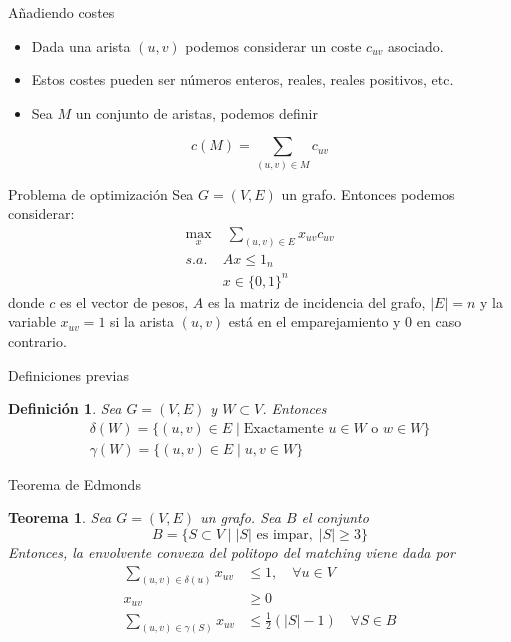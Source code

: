 \documentclass{beamer}
\newtheorem{defi}{Definici\'on}[section]
\newtheorem{thm}{Teorema}[section]
\begin{document}
\begin{frame}{Añadiendo costes}
\begin{itemize}
\item Dada una arista $(u,v)$ podemos considerar un coste $c_{uv}$ asociado. 
\item Estos costes pueden ser números enteros, reales, reales positivos, etc.
\item Sea $M$ un conjunto de aristas, podemos definir
\end{itemize}
$$
c(M) = \sum_{(u,v)\in M} c_{uv}
$$

\end{frame}
\begin{frame}{Problema de optimización}
Sea $G=(V,E)$ un grafo. Entonces podemos considerar:
\begin{align*}
\max_{x} &\; \sum_{(u,v)\in E} x_{uv}c_{uv}  \nonumber\\ 
s.a.\;  &  Ax\leq 1_n \\
& x\in\{0,1\}^n\nonumber
\end{align*}
donde $c$ es el vector de pesos, $A$ es la matriz de incidencia del grafo, $|E|=n$ y la variable $x_{uv}=1$ si la arista $(u,v)$ está en el emparejamiento y $0$ en caso contrario.
\end{frame}
\begin{frame}{Definiciones previas}
\begin{defi}
Sea $G=(V,E)$ y $W\subset V$. Entonces 
\begin{gather*}
\delta(W) = \{(u,v)\in E \mid \text{Exactamente $u \in W$ o $w \in W$} \}\\
\gamma(W) = \{(u,v)\in E \mid u,v \in W\}
\end{gather*}
\end{defi}
\end{frame}
\begin{frame}{Teorema de Edmonds}
\begin{thm}
Sea $G=(V,E)$ un grafo. Sea $B$ el conjunto
$$
B = \{S\subset V \mid |S| \text{ es impar},\;|S|\geq 3\}
$$
Entonces, la envolvente convexa del politopo del matching viene dada por
\begin{align*}
\sum_{(u,v)\in\delta(u)} x_{uv} &\leq 1, \quad \forall u\in V\\
x_{uv} &\geq 0\\
\sum_{(u,v)\in \gamma(S)} x_{uv}& \leq \frac{1}{2}(|S|-1)\quad \forall S \in B	
\end{align*}
\end{thm}
\end{frame}
\end{document}
